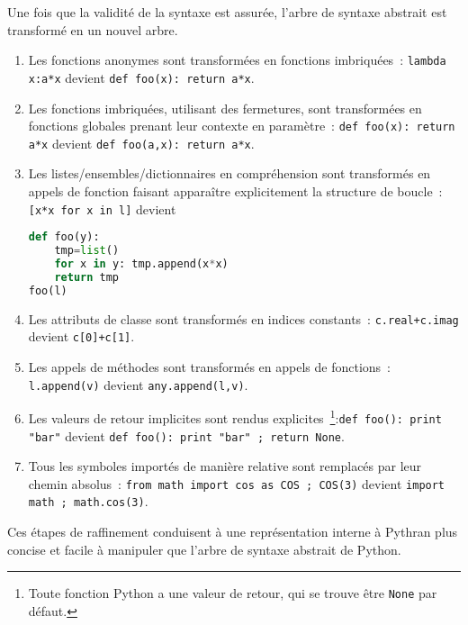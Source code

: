 \documentclass[renpar]{compas2013}
\begin{document}
Une fois que la validité de la syntaxe est assurée, l'arbre de syntaxe
abstrait est transformé en un nouvel arbre.
\begin{enumerate}

  \item Les fonctions anonymes sont transformées en fonctions imbriquées~:
	\texttt{lambda x:a*x} devient \texttt{def foo(x): return a*x}.

  \item Les fonctions imbriquées, utilisant des fermetures, sont
	transformées en fonctions globales prenant leur contexte en
	paramètre~: \texttt{def foo(x): return a*x} devient \texttt{def
	foo(a,x): return a*x}.

  \item Les listes/ensembles/dictionnaires en compréhension sont
	transformés en appels de fonction faisant apparaître explicitement la
	structure de boucle~:\texttt{[x*x for x in l]} devient
\begin{lstlisting}[language=python]
def foo(y):
	tmp=list()
	for x in y: tmp.append(x*x)
	return tmp
foo(l)
\end{lstlisting}

  \item Les attributs de classe sont transformés en indices constants~:
	\texttt{c.real+c.imag} devient \texttt{c[0]+c[1]}.

  \item Les appels de méthodes sont transformés en appels de fonctions~:
	\texttt{l.append(v)} devient \texttt{any.append(l,v)}.

  \item Les valeurs de retour implicites sont rendus
	explicites~\footnote{Toute fonction Python a une valeur de retour, qui
	se trouve être \texttt{None} par défaut.}:\texttt{def foo(): print
	"bar"} devient \texttt{def foo(): print "bar" ; return None}.

  \item Tous les symboles importés de manière relative sont remplacés par
	leur chemin absolus~: \texttt{from math import cos as COS ; COS(3)}
	devient \texttt{import math ; math.cos(3)}.

\end{enumerate}

Ces étapes de raffinement conduisent à une représentation interne à
Pythran plus concise et facile à manipuler que l'arbre de syntaxe abstrait
de Python. 
\end{document}

